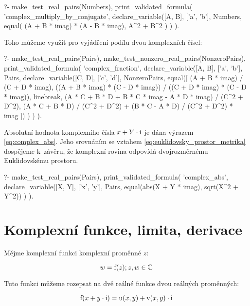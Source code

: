 \begin{prolog}
?-	make_test_real_pairs(Numbers),
	print_validated_formula(
		'complex_multiply_by_conjugate',
		declare_variable([A, B], ['a', 'b'], Numbers,
			equal(
				(A + B * imag) * (A - B * imag),
				A^2 + B^2
			)
		)
	).
\end{prolog}

Toho můžeme využít pro vyjádření podílu dvou komplexních čísel:

\begin{prolog}
?-	make_test_real_pairs(Pairs),
	make_test_nonzero_real_pairs(NonzeroPairs),
	print_validated_formula(
		'complex_fraction',
		declare_variable([A, B], ['a', 'b'], Pairs,
			declare_variable([C, D], ['c', 'd'], NonzeroPairs,
				equal([
					(A + B * imag) / (C + D * imag),
					((A + B * imag) * (C - D * imag)) / ((C + D * imag) * (C - D * imag)),
					linebreak,
					(A * C + B * D + B * C * imag - A * D * imag) / (C^2 + D^2),
					(A * C + B * D) / (C^2 + D^2) + (B * C - A * D) / (C^2 + D^2) * imag
				])
			)
		)
	).
\end{prolog}

Absolutní hodnota komplexního čísla \(x + Y \cdot \mathrm{i}\) je dána výrazem \eqref{eq:complex_abs}. Jeho srovnáním se vztahem \eqref{eq:euklidovsky_prostor_metrika} dospějeme k~závěru, že komplexní rovina odpovídá dvojrozměrnému Euklidovskému prostoru.

\begin{prolog}
?-	make_test_real_pairs(Pairs),
	print_validated_formula(
		'complex_abs',
		declare_variable([X, Y], ['x', 'y'], Pairs,
			equal(abs(X + Y * imag), sqrt(X^2 + Y^2))
		)
	).
\end{prolog}

\section{Komplexní funkce, limita, derivace}

Mějme komplexní funkci komplexní proměnné \(z\):

\begin{equation}
w = \mathrm{f}(z); z, w \in \mathbb{C}
\end{equation}

Tuto funkci můžeme rozepsat na dvě reálné funkce dvou reálných proměnných:

\begin{equation}
\mathrm{f}(x + y \cdot \mathrm{i}) = \mathrm{u}(x, y) + \mathrm{v}(x, y) \cdot \mathrm{i}
\end{equation}

